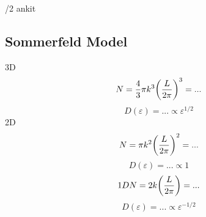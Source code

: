 \documentclass[UTF8]{ctexart} %
\numberwithin{equation}{section}
\begin{document}
/2 ankit\\
\subsection{Sommerfeld Model}
3D
\begin{equation}\label{key}
N = \dfrac{4}{3}\pi k^3\qty(\dfrac{L}{2\pi})^3 = ...
\end{equation}
\begin{equation}\label{key}
D(\varepsilon) = ... \propto \varepsilon^{1/2}
\end{equation}
2D
\begin{equation}\label{key}
N = \pi k^2\qty(\dfrac{L}{2\pi})^2 = ...
\end{equation}
\begin{equation}\label{key}
D(\varepsilon) = ... \propto 1
\end{equation}\begin{equation}\label{key}
1D
N = 2k\qty(\dfrac{L}{2\pi}) = ...
\end{equation}
\begin{equation}\label{key}
D(\varepsilon) = ... \propto \varepsilon^{-1/2}
\end{equation}
\end{document}

